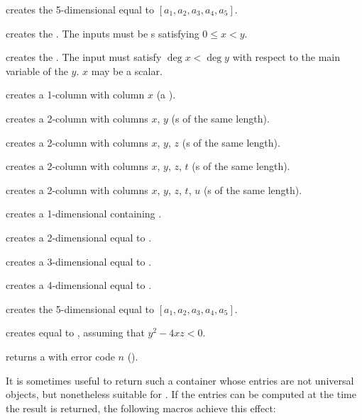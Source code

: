  creates the
5-dimensional  equal to $[a_1,a_2,a_3,a_4,a_5]$.

 creates the  .
The inputs must be s satisfying $0 \leq x < y$.

 creates the  .
The input must satisfy $\deg x < \deg y$ with respect to the main variable of
the  $y$. $x$ may be a scalar.

 creates a 1-column  with column $x$
(a ).

 creates a 2-column  with columns
$x$, $y$ (s of the same length).

 creates a 2-column  with columns
$x$, $y$, $z$ (s of the same length).

 creates a 2-column 
with columns $x$, $y$, $z$, $t$ (s of the same length).

 creates a 2-column
 with columns $x$, $y$, $z$, $t$, $u$ (s of the same
length).

 creates a 1-dimensional  containing .

 creates a 2-dimensional  equal to
\kbd{[x,y]}.

 creates a 3-dimensional 
equal to \kbd{[x,y,z]}.

 creates a 4-dimensional 
equal to \kbd{[x,y,z,t]}.

 creates the
5-dimensional  equal to $[a_1,a_2,a_3,a_4,a_5]$.

 creates  equal
to , assuming that $y^2 - 4xz < 0$.

 returns a  with error code $n$
().

\smallskip

It is sometimes useful to return such a container whose entries are not
universal objects, but nonetheless suitable for .
If the entries can be computed at the time the result is returned, the
following macros achieve this effect:

